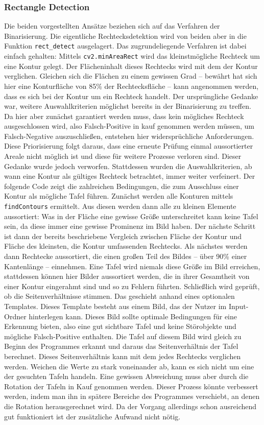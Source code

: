 \subsubsection{Rectangle Detection}

Die beiden vorgestellten Ansätze beziehen sich auf das Verfahren der Binarisierung. Die eigentliche Rechtecksdetektion wird von beiden aber in die Funktion \verb|rect_detect| ausgelagert. Das zugrundeliegende Verfahren ist dabei einfach gehalten: Mittels \verb|cv2.minAreaRect| wird das kleinstmögliche Rechteck um eine Kontur gelegt. Der Flächeninhalt dieses Rechtecks wird mit dem der Kontur verglichen. Gleichen sich die Flächen zu einem gewissen Grad -- bewährt hat sich hier eine Konturfläche von 85\% der Rechtecksfläche -- kann angenommen werden, dass es sich bei der Kontur um ein Rechteck handelt.
Der ursprüngliche Gedanke war, weitere Auswahlkriterien möglichst bereits in der Binarisierung zu treffen. Da hier aber zunächst garantiert werden muss, dass kein mögliches Rechteck ausgeschlossen wird, also Falsch-Positive in kauf genommen werden müssen, um Falsch-Negative auszuschließen, entstehen hier widersprüchliche Anforderungen. Diese Priorisierung folgt daraus, dass eine erneute Prüfung einmal aussortierter Areale nicht möglich ist und diese für weitere Prozesse verloren sind.
Dieser Gedanke wurde jedoch verworfen. Stattdessen wurden die Auswahlkriterien, ab wann eine Kontur als gültiges Rechteck betrachtet, immer weiter verfeinert. Der folgende Code zeigt die zahlreichen Bedingungen, die zum Ausschluss einer Kontur als mögliche Tafel führen.
Zunächst werden alle Konturen mittels \verb|findContours| ermittelt. Aus diesen werden dann alle zu kleinen Elemente aussortiert: Was in der Fläche eine gewisse Größe unterschreitet kann keine Tafel sein, da diese immer eine gewisse Prominenz im Bild haben. Der nächste Schritt ist dann der bereits beschriebene Vergleich zwischen Fläche der Kontur und Fläche des kleinsten, die Kontur umfassenden Rechtecks. Als nächstes werden dann Rechtecke aussortiert, die einen großen Teil des Bildes -- über 90\% einer Kantenlänge -- einnehmen. Eine Tafel wird niemals diese Größe im Bild erreichen, stattdessen können hier Bilder aussortiert werden, die in ihrer Gesamtheit von einer Kontur eingerahmt sind und so zu Fehlern führten. Schließlich wird geprüft, ob die Seitenverhältnisse stimmen. Das geschieht anhand eines optionalen Templates. Dieses Template besteht aus einem Bild, das der Nutzer im Input-Ordner hinterlegen kann. Dieses Bild sollte optimale Bedingungen für eine Erkennung bieten, also eine gut sichtbare Tafel und keine Störobjekte und mögliche Falsch-Positive enthalten. Die Tafel auf diesem Bild wird gleich zu Beginn des Programmes erkannt und daraus das Seitenverhältnis der Tafel berechnet. Dieses Seitenverhältnis kann mit dem jedes Rechtecks verglichen werden. Weichen die Werte zu stark voneinander ab, kann es sich nicht um eine der gesuchten Tafeln handeln. Eine gewissen Abweichung muss aber durch die Rotation der Tafeln in Kauf genommen werden. Dieser Prozess könnte verbessert werden, indem man ihn in spätere Bereiche des Programmes verschiebt, an denen die Rotation herausgerechnet wird. Da der Vorgang allerdings schon ausreichend gut funktioniert ist der zusätzliche Aufwand nicht nötig.

